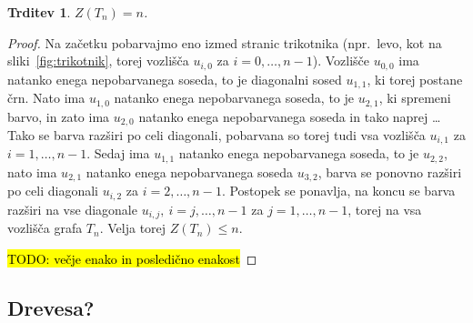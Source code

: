 \documentclass[12pt,a4paper,twoside]{article}
\theoremstyle{definition} %
\theoremstyle{plain} %
\newtheorem{trditev}[definicija]{Trditev}
\numberwithin{equation}{section}  %
\begin{document}
\begin{trditev}
    $Z(T_n) = n$. 
\end{trditev}
\begin{proof}
    Na začetku pobarvajmo eno izmed stranic trikotnika (npr.~levo, kot na sliki~\ref{fig:trikotnik}, torej vozlišča $u_{i,0}$ za $i = 0, \ldots, n-1$). Vozlišče $u_{0,0}$ ima natanko enega nepobarvanega soseda, to je diagonalni sosed $u_{1,1}$, ki torej postane črn. Nato ima $u_{1,0}$ natanko enega nepobarvanega soseda, to je $u_{2,1}$, ki spremeni barvo, in zato ima $u_{2,0}$ natanko enega nepobarvanega soseda in tako naprej \ldots Tako se barva razširi po celi diagonali, pobarvana so torej tudi vsa vozlišča $u_{i,1}$ za $i = 1, \ldots, n-1$. Sedaj ima $u_{1,1}$ natanko enega nepobarvanega soseda, to je $u_{2,2}$, nato ima $u_{2,1}$ natanko enega nepobarvanega soseda $u_{3,2}$, barva se ponovno razširi po celi diagonali $u_{i,2}$ za $i = 2, \ldots, n-1$. Postopek se ponavlja, na koncu se barva razširi na vse diagonale $u_{i,j},\ i = j, \ldots, n-1$ za $j = 1, \ldots, n-1$, torej na vsa vozlišča grafa $T_n$. Velja torej $Z(T_n) \leq n$.
    
    \hl{TODO: večje enako in posledično enakost}
\end{proof}

\subsection{Drevesa?}
\end{document}

